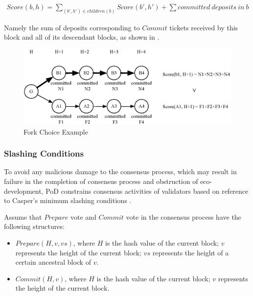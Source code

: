 
\begin{align}
Score(b, h) = \sum_{(b',h') \in children(b)}Score(b', h') + \sum committed~deposits~in~b
\end{align}
\noindent

Namely the sum of deposits corresponding to $Commit$ tickets received by this block and all of its descendant blocks, as shown in .


\begin{figure}[h]
\centering
\includegraphics[width=12cm]{./figs/fork}
\caption{Fork Choice Example}
\label{fig:fork_choice}
\end{figure}

\subsubsection{Slashing Conditions}
\label{pod:design:vote}

To avoid any malicious damage to the consensus process, which may result in failure in the completion of consensus process and obstruction of eco-development, PoD constrains consensus activities of validators based on reference to Casper’s minimum slashing conditions \cite{minimal_slash_rules}.


Assume that $Prepare$ vote and $Commit$ vote in the consensus process have the following structures:


\begin{itemize}
\item $Prepare(H, v, vs)$, where $H$ is the hash value of the current block; $v$ represents the height of the current block; $vs$ represents the height of a certain ancestral block of $v$.

\item $Commit(H, v)$, where $H$ is the hash value of the current block; $v$ represents the height of the current block.
\end{itemize}

